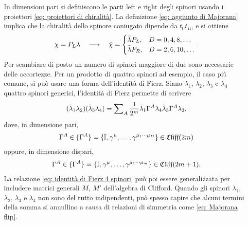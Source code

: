 In dimensioni pari si definiscono le parti left e right degli spinori usando i proiettori \eqref{eq: proiettori di chiralità}. La definizione \eqref{eq: aggiunto di Majorana} implica che la chiralità dello spinore coniugato dipende da $t_0t_D$, e si ottiene 
\begin{equation}
    \chi = P_L\lambda \quad \longrightarrow \quad \bar{\chi} = 
    \begin{cases}
        \bar{\lambda}P_L, &D = 0,4,8,\dots \\
        \bar{\lambda}P_R, &D = 2,6,10,\dots 
    \end{cases}.
\end{equation}
Per scambiare di posto un numero di spinori maggiore di due sono necessarie delle accortezze. Per un prodotto di quattro spinori ad esempio, il caso più comune, si può usare una forma dell'identità di Fierz. Siano $\lambda_1$, $\lambda_2$, $\lambda_3$ e $\lambda_4$ quattro spinori generici, l'identità di Fierz permette di scrivere
\begin{equation}
\label{eq: identità di Fierz 4 spinori}
    (\bar{\lambda}_1\lambda_2)(\bar{\lambda}_3\lambda_4) = \sum\nolimits_A\frac{1}{2^m}\bar{\lambda}_1\Gamma^A\lambda_4\bar{\lambda}_3\Gamma^A\lambda_2,
\end{equation}
dove, in dimensione pari,
\begin{equation}
    \Gamma^A \in \{\Gamma^A\} = \{\mathbb{I},\gamma^\mu,\dots,\gamma^{\mu_1\cdots\mu_D}\} \in \mathfrak{Cliff}(2m)
\end{equation}
oppure, in dimensione dispari,
\begin{equation}
    \Gamma^A \in \{\Gamma^A\} = \{\mathbb{I},\gamma^\mu,\dots,\gamma^{\mu_1\cdots\mu_m}\} \in \mathfrak{Cliff}(2m + 1).
\end{equation}
La relazione \eqref{eq: identità di Fierz 4 spinori} può poi essere generalizzata per includere matrici generali $M$, $M'$ dell'algebra di Clifford. Quando gli spinori $\lambda_1$, $\lambda_2$, $\lambda_3$ e $\lambda_4$ non sono del tutto indipendenti, può spesso capire che alcuni termini della somma si annullino a causa di relazioni di simmetria come \eqref{eq: Majorana flip}. 

